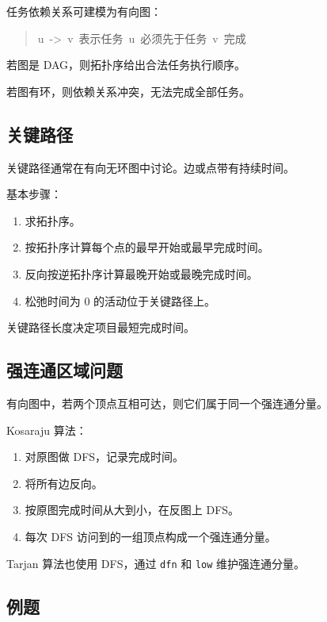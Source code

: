 \documentclass[UTF8,zihao=-4]{ctexart}
\begin{document}
任务依赖关系可建模为有向图：

\begin{quote}
\small\ttfamily\raggedright
\relax u\ ->\ v\ 表示任务\ u\ 必须先于任务\ v\ 完成\\
\end{quote}

若图是 DAG，则拓扑序给出合法任务执行顺序。

若图有环，则依赖关系冲突，无法完成全部任务。

\subsection*{关键路径}

关键路径通常在有向无环图中讨论。边或点带有持续时间。

基本步骤：

\begin{enumerate}
\item 求拓扑序。
\item 按拓扑序计算每个点的最早开始或最早完成时间。
\item 反向按逆拓扑序计算最晚开始或最晚完成时间。
\item 松弛时间为 0 的活动位于关键路径上。
\end{enumerate}

关键路径长度决定项目最短完成时间。

\subsection*{强连通区域问题}

有向图中，若两个顶点互相可达，则它们属于同一个强连通分量。

Kosaraju 算法：

\begin{enumerate}
\item 对原图做 DFS，记录完成时间。
\item 将所有边反向。
\item 按原图完成时间从大到小，在反图上 DFS。
\item 每次 DFS 访问到的一组顶点构成一个强连通分量。
\end{enumerate}

Tarjan 算法也使用 DFS，通过 \texttt{dfn} 和 \texttt{low} 维护强连通分量。

\subsection*{例题}
\end{document}
